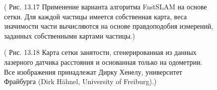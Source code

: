\documentclass[10pt,a4paper]{article}
\begin{document}
\begin{figure}[H]
	\caption{ ( Рис. 13.17 Применение варианта алгоритма FastSLAM на основе сетки. Для каждой частицы имеется собственная карта, веса значимости части вычисляются на основе правдоподобия измерений, заданных собственными картами частицы.) }
	\label{fig:1317orig}
\end{figure}

\begin{figure}[H]
	\caption{ ( Рис. 13.18 Карта сетки занятости, сгенерированная из данных лазерного датчика расстояния и основанная только на одометрии. Все изображения принадлежат Дирку Хенелу, университет Фрайбурга (Dirk Hähnel, University of Freiburg).) }
	\label{fig:1318orig}
\end{figure}
\end{document}
